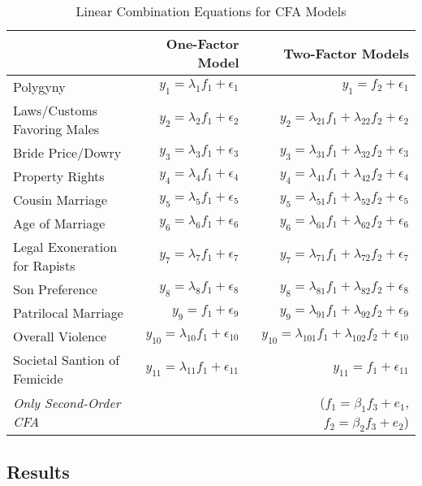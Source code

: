 \documentclass[letterpaper,11pt]{article}
\begin{document}
\begin{table}[htb]
\footnotesize
    \centering
        \caption{Linear Combination Equations for CFA Models}
    \begin{tabular}{l|r|r}
      &  One-Factor Model & Two-Factor Models \\
     \hline
    Polygyny & $y_1 = \lambda_1 f_1 + \epsilon_1$ & $y_1 = f_2 + \epsilon_1$  \\
    Laws/Customs Favoring Males & $y_2 = \lambda_2 f_1 + \epsilon_2$ &  $y_2 = \lambda_{21} f_1 + \lambda_{22} f_2 + \epsilon_2$  \\
    Bride Price/Dowry & $y_3 = \lambda_3 f_1 + \epsilon_3$ & $y_3 = \lambda_{31} f_1 + \lambda_{32} f_2 + \epsilon_3$  \\
    Property Rights & $y_4 = \lambda_4 f_1 + \epsilon_4$ & $y_4 = \lambda_{41} f_1 + \lambda_{42} f_2 + \epsilon_4$  \\    
    Cousin Marriage & $y_5 = \lambda_5 f_1 + \epsilon_5$ & $y_5 = \lambda_{51} f_1 + \lambda_{52} f_2 + \epsilon_5$  \\
    Age of Marriage & $y_6 = \lambda_6 f_1 + \epsilon_6$ & $y_6 = \lambda_{61} f_1 + \lambda_{62} f_2 + \epsilon_6$  \\
    Legal Exoneration for Rapists & $y_7 = \lambda_7 f_1 + \epsilon_7$ & $y_7 = \lambda_{71} f_1 + \lambda_{72} f_2 + \epsilon_7$   \\
    Son Preference & $y_8 = \lambda_8 f_1 + \epsilon_8$ & $y_8 = \lambda_{81} f_1 + \lambda_{82} f_2 + \epsilon_8$  \\
    Patrilocal Marriage & $y_9 =  f_1 + \epsilon_9$ & $y_9 = \lambda_{91} f_1 + \lambda_{92} f_2 + \epsilon_9$   \\
    Overall Violence & $y_{10} = \lambda_{10} f_1 + \epsilon_{10}$ & $y_{10} = \lambda_{101} f_1 + \lambda_{102} f_2 + \epsilon_{10}$   \\
    Societal Santion of Femicide & $y_{11} = \lambda_{11} f_1 + \epsilon_{11}$ & $y_{11} = f_1 + \epsilon_{11}$  \\
    \hline
    \emph{Only Second-Order CFA} & & ($f_1 = \beta_1 f_3 + e_1$, $f_2 = \beta_2 f_3 + e_2$) \\
    \end{tabular}
    \label{tab:cfamodels}
\end{table}

\subsection{Results}
\end{document}
